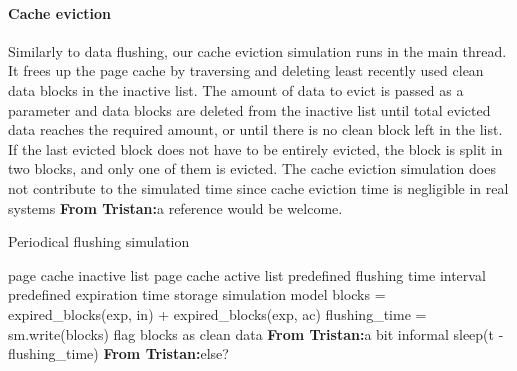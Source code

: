 \documentclass[conference]{IEEEtran}
\newcommand{\Desc}[2]{\State \makebox[2em][l]{#1}#2}
\newcommand{\tristan}[1]{\color{orange}\textbf{From Tristan:}#1\color{black}}
\begin{document}
    \paragraph*{Cache eviction}
    Similarly to data flushing, our cache eviction simulation runs in
    the main thread. It frees up the page cache by traversing and deleting 
    least recently used clean data blocks in the inactive list.
    The amount of data to evict is passed as a parameter and data blocks are deleted 
    from the inactive list until total evicted data reaches the required amount,
    or until there is no clean block left in the list.
    If the last evicted block does not have to be entirely evicted, the block is split in two blocks,
    and only one of them is evicted.
    The cache eviction simulation does not contribute to the simulated time 
    since cache eviction time is negligible in real systems \tristan{a reference would be welcome}.
    
    \begin{algorithm}\caption{Periodical flushing simulation}\label{alg:pdflush}
        \small
        \begin{algorithmic}[1]
            \Input
                \Desc{in}{page cache inactive list}
                \Desc{ac}{page cache active list}
                \Desc{t}{predefined flushing time interval}
                \Desc{exp}{predefined expiration time}
                \Desc{sm}{storage simulation model}
               \EndInput
                \State blocks = expired\_blocks(exp, in) + expired\_blocks(exp, ac) 
                \State flushing\_time = sm.write(blocks)
                \State flag blocks as clean data \tristan{a bit informal}
                    \State sleep(t - flushing\_time)
                \EndIf \tristan{else?}
            \EndWhile
        \end{algorithmic}
    \end{algorithm}
\end{document}
